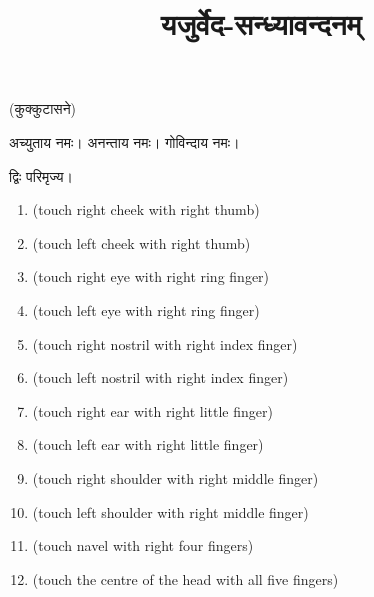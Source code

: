 \setmainfont[Script=Devanagari,Mapping=tex-text,Mapping=devanagarinumerals,AutoFakeBold=2.0]{Siddhanta}
\title{\Huge यजुर्वेद-सन्ध्यावन्दनम्}
\date{}
\maketitle
\tableofcontents 

\clearpage
{}
\renewcommand{\sectionmark}[1]{%
\markboth{\large #1 (प्रातः सन्ध्या)}{}}

(कुक्कुटासने)

अच्युताय नमः। अनन्ताय नमः। गोविन्दाय नमः। 

द्विः परिमृज्य।


\begin{enumerate}
    \item {} {\scriptsize (touch right cheek with right thumb)}
    \item {} {\scriptsize (touch left cheek with right thumb)}
    \item {} {\scriptsize (touch right eye with right ring finger)}
    \item {} {\scriptsize (touch left eye with right ring finger)}
    \item {} {\scriptsize (touch right nostril with right index finger)}
    \item {} {\scriptsize (touch left nostril with right index finger)}
    \item {} {\scriptsize (touch right ear with right little finger)}
    \item {} {\scriptsize (touch left ear with right little finger)}
    \item {} {\scriptsize (touch right shoulder with right middle finger)}
    \item {} {\scriptsize (touch left shoulder with right middle finger)}
    \item {} {\scriptsize (touch navel with right four fingers)}
    \item {} {\scriptsize (touch the centre of the head with all five fingers)}
\end{enumerate}


